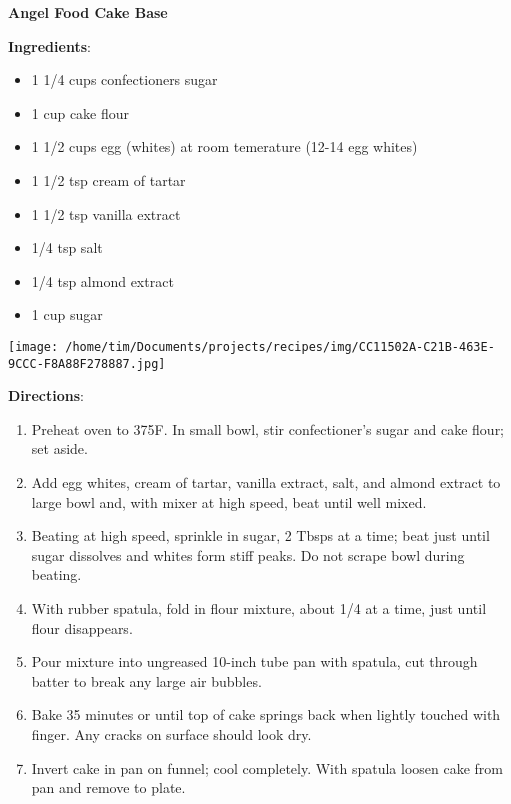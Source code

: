 \documentclass[11pt, twoside, openany]{book}
\begin{document}
\noindent\begin{minipage}[t]{\linewidth}%
{\Large\textbf{Angel Food Cake Base}} \label{angel-food-cake-base}\hfill\textit{}\\
\noindent\begin{minipage}[t]{0.78\linewidth}%
\textbf{Ingredients}:\vspace{-3mm}
\begin{multicols}{2}
\begin{itemize}\setlength\itemsep{-1mm}
\item 1 1/4 cups confectioners sugar
\item 1 cup cake flour
\item 1 1/2 cups egg (whites) at room temerature (12-14 egg whites)
\item 1 1/2 tsp cream of tartar
\item 1 1/2 tsp vanilla extract
\item 1/4 tsp salt
\item 1/4 tsp almond extract
\item 1 cup sugar
\end{itemize}
\end{multicols}
\end{minipage}
\noindent\begin{minipage}[t]{0.18\linewidth}
\centering \strut\vspace*{-\baselineskip}\newline
\texttt{[image: /home/tim/Documents/projects/recipes/img/CC11502A-C21B-463E-9CCC-F8A88F278887.jpg]}\\
\end{minipage}\vspace{3mm}
\textbf{Directions}:
\vspace{-3mm}\begin{enumerate}\setlength\itemsep{-1mm}
\item Preheat oven to 375F. In small bowl, stir confectioner's sugar and cake flour; set aside.
\item Add egg whites, cream of tartar, vanilla extract, salt, and almond extract to large bowl and, with mixer at high speed, beat until well mixed.
\item Beating at high speed, sprinkle in sugar, 2 Tbsps at a time; beat just until sugar dissolves and whites form stiff peaks. Do not scrape bowl during beating.
\item With rubber spatula, fold in flour mixture, about 1/4 at a time, just until flour disappears.
\item Pour mixture into ungreased 10-inch tube pan with spatula, cut through batter to break any large air bubbles.
\item Bake 35 minutes or until top of cake springs back when lightly touched with finger. Any cracks on surface should look dry.
\item Invert cake in pan on funnel; cool completely. With spatula loosen cake from pan and remove to plate.
\end{enumerate}
\end{minipage}\vspace{8mm}
\end{document}

